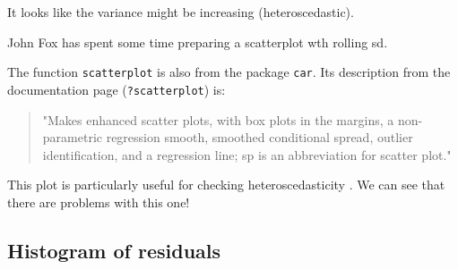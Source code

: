 \documentclass[titlepage]{book}\usepackage{knitr}
\begin{document}
It looks like the variance might be increasing (heteroscedastic). 

John Fox has spent some time preparing a scatterplot wth rolling sd.


\begin{knitrout}
\color{fgcolor}
\end{knitrout}



The function \texttt{scatterplot} is also from the package \texttt{car}. Its description from the documentation page (\texttt{?scatterplot}) is: 
\begin{quote}
"Makes enhanced scatter plots, with box plots in the margins, a non-parametric regression smooth, smoothed conditional spread, outlier identification, and a regression line; sp is an abbreviation for scatter plot."
\end{quote}
This plot is particularly useful for checking heteroscedasticity .  We can see that there are problems with this one!

\subsection{Histogram of residuals}

\begin{knitrout}
\color{fgcolor}\begin{kframe}
\begin{alltt}
 \hlkwb{<-}  \hlstd{(} \hlopt{+}
  \hlstd{(} \hlstd{=} \hlstd{,}  \hlstd{=} \hlstd{,}  \hlstd{=}  \hlstd{)}
\end{alltt}
\end{kframe}
\end{knitrout}
\end{document}
